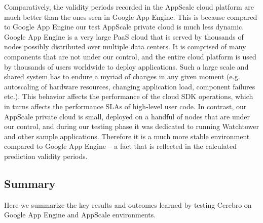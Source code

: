 Comparatively, the validity periods recorded in the AppScale
cloud platform are much better than the ones seen in Google App Engine. This is because compared to Google App Engine our
test AppScale private cloud is much less dynamic. Google App Engine is a very large PaaS cloud that is served by thousands of
nodes possibly distributed over multiple data centers. It is comprised of many components that are not under our control,
and the entire cloud platform is used by thousands of users worldwide to deploy applications. Such a large scale and
shared system has to endure a myriad of changes in any given moment (e.g. autoscaling of hardware resources, 
changing application load, component failures etc.). This behavior affects the performance of the cloud SDK operations, which
in turns affects the performance SLAs of high-level user code. In contrast, our AppScale
private cloud is small, deployed on a handful of nodes that are under our control, and during our testing phase it was dedicated
to running Watchtower and other sample applications. Therefore it is a much more stable environment compared to Google 
App Engine -- a fact that is reflected in the calculated prediction validity periods. 

\subsection{Summary}
Here we summarize the key results and outcomes learned by testing Cerebro on Google App Engine and AppScale environments.

